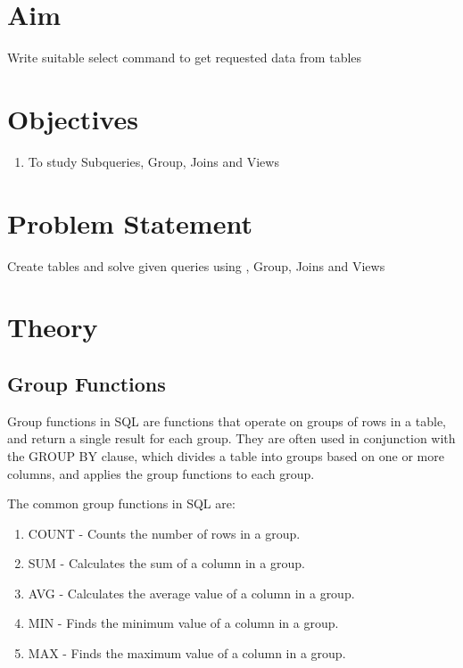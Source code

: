 \documentclass[11pt]{article}
\begin{document}
\tableofcontents
\thispagestyle{empty}
\clearpage

\setcounter{page}{1}

\section{Aim}
Write suitable select command to get requested data from tables

\section{Objectives}
\begin{enumerate}
	\item To study Subqueries, Group, Joins and Views
\end{enumerate}

\section{Problem Statement}
Create tables and solve given queries using , Group, Joins and Views

\section{Theory}

\subsection{Group Functions}
Group functions in SQL are functions that operate on groups of rows in a table, and return a single result for each group. They are often used in conjunction with the GROUP BY clause, which divides a table into groups based on one or more columns, and applies the group functions to each group.

The common group functions in SQL are:



\begin{enumerate}
	\item COUNT - Counts the number of rows in a group.
	\item SUM - Calculates the sum of a column in a group.
	\item AVG - Calculates the average value of a column in a group.
	\item MIN - Finds the minimum value of a column in a group.
	\item MAX - Finds the maximum value of a column in a group.
\end{enumerate}
\end{document}
